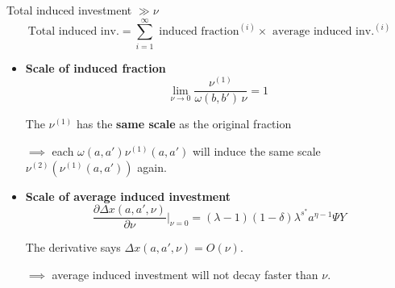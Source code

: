 \documentclass[9pt]{beamer}
\begin{document}
\begin{frame}{Total induced investment $\gg \nu$}
	$$\text{Total induced inv.} = \sum_{i=1}^{\infty} \text{ induced fraction}^{(i)} \times \text{ average induced inv.}^{(i)}$$

	\begin{itemize}
		\item \textbf{Scale of induced fraction}
		\[
		 \lim_{\nu\to 0}\frac{\nu^{(1)}}{\omega(b,b')\,\nu}=1\
		\]
		
		The $\nu^{(1)}$ has the \textbf{same scale} as the original fraction 
			
		$\implies$ each $\omega(a, a') \nu^{(1)}(a, a')$ will induce the same scale $\nu^{(2)}(\nu^{(1)}(a, a'))$ again.

		\vspace{0.2em}

		\item \textbf{Scale of average induced investment}
		\[
			\frac{\partial \Delta x(a, a', \nu)}{\partial \nu}\Big|_{\nu=0} = (\lambda - 1)(1-\delta) \lambda^{s^*} a^{\eta - 1}\Psi Y
		\]
		
		The derivative says $\Delta x(a, a', \nu) = O(\nu)$.
		
		$\implies$ average induced investment will not decay faster than $\nu$.
	\end{itemize}
\end{frame}
\end{document}
